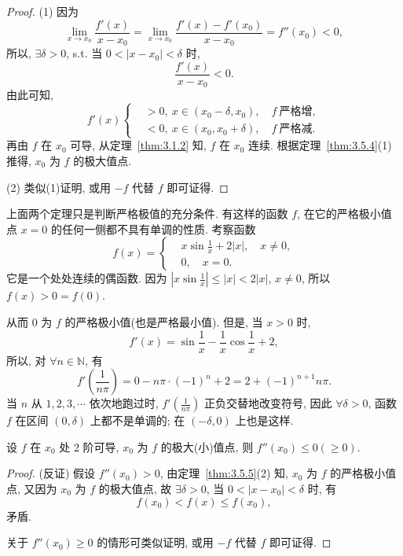 \begin{proof}
(1) 因为
\[
\lim_{x\to x_{0}}\frac{f'(x)}{x-x_{0}}=\lim_{x\to x_{0}}\frac{f'(x)-f'(x_{0})}{x-x_{0}}=f''(x_{0})<0,
\]
所以, $\exists\delta>0$, s.t. 当 $0<|x-x_{0}|<\delta$ 时,
\[
\frac{f'(x)}{x-x_{0}}<0.
\]
由此可知,
\[
f'(x)\left\{
\begin{aligned}
&>0,\ x\in(x_{0}-\delta,x_{0}),\quad f\ \text{严格增},\\
&<0,\ x\in(x_{0},x_{0}+\delta),\quad f\ \text{严格减}.
\end{aligned}
\right.
\]
再由 $f$ 在 $x_{0}$ 可导, 从定理~\ref{thm:3.1.2} 知, $f$ 在 $x_{0}$ 连续. 根据定理~\ref{thm:3.5.4}(1) 推得, $x_{0}$ 为 $f$ 的极大值点.

(2) 类似(1)证明, 或用 $-f$ 代替 $f$ 即可证得.
\end{proof}

\begin{example}\label{ex:3.5.9}
上面两个定理只是判断严格极值的充分条件. 有这样的函数 $f$, 在它的严格极小值点 $x=0$ 的任何一侧都不具有单调的性质. 考察函数
\[
f(x)=\left\{
\begin{aligned}
&x\sin\frac{1}{x}+2|x|,\quad x\neq 0,\\
&0,\quad x=0.
\end{aligned}
\right.
\]
它是一个处处连续的偶函数. 因为 $\left|x\sin\frac{1}{x}\right|\leqslant|x|<2|x|$, $x\neq 0$, 所以 $f(x)>0=f(0)$.

从而 0 为 $f$ 的严格极小值(也是严格最小值). 但是, 当 $x>0$ 时,
\[
f'(x)=\sin\frac{1}{x}-\frac{1}{x}\cos\frac{1}{x}+2,
\]
所以, 对 $\forall n\in\mathbb{N}$, 有
\[
f'\left(\frac{1}{n\pi}\right)=0-n\pi\cdot(-1)^{n}+2=2+(-1)^{n+1}n\pi.
\]
当 $n$ 从 $1,2,3,\cdots$ 依次地跑过时, $f'\left(\frac{1}{n\pi}\right)$ 正负交替地改变符号, 因此 $\forall\delta>0$, 函数 $f$ 在区间 $(0,\delta)$ 上都不是单调的; 在 $(-\delta,0)$ 上也是这样.
\end{example}

\begin{corollary}\label{cor:3.5.1}
设 $f$ 在 $x_{0}$ 处 2 阶可导, $x_{0}$ 为 $f$ 的极大(小)值点, 则 $f''(x_{0})\leqslant 0(\geqslant 0)$.
\end{corollary}

\begin{proof}
(反证) 假设 $f''(x_{0})>0$, 由定理~\ref{thm:3.5.5}(2) 知, $x_{0}$ 为 $f$ 的严格极小值点, 又因为 $x_{0}$ 为 $f$ 的极大值点, 故 $\exists\delta>0$, 当 $0<|x-x_{0}|<\delta$ 时, 有
\[
f(x_{0})<f(x)\leqslant f(x_{0}),
\]
矛盾.

关于 $f''(x_{0})\geqslant 0$ 的情形可类似证明, 或用 $-f$ 代替 $f$ 即可证得.
\end{proof}

